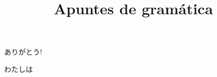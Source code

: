\documentclass[a4paper, 11pt]{book}
\title{Apuntes de gramática}
\newcommand{\textjp}[1]{\begin{CJK}{UTF8}#1\end{CJK}}
\newenvironment{jpexample}
{
	\begin{CJK}{UTF8}
	\huge
	\bfseries

}
{
	\end{CJK}
}
\begin{document}
	\maketitle

	\begin{jpexample}
		ありがとう!
	\end{jpexample}

	\textjp{わたしは}
\end{document}
